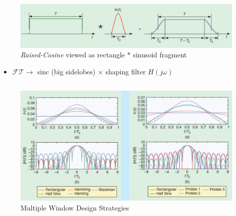 \documentclass[xcolor=dvipsnames,aspectratio=169]{beamer}
\begin{document}
{\begin{figure}
 \centering
 \caption{\textit{Raised-Cosine} viewed as rectangle $*$ sinusoid fragment}
 \includegraphics[width=1\textwidth]{rcresponse2.png}
\end{figure}
\begin{itemize}
\item $\mathcal{FT}\to$ sinc (big sidelobes) $\times$ shaping filter $H(j\omega)$
\begin{columns}
\end{columns}

\end{itemize}
\begin{figure}
 \centering
 \caption{Multiple Window Design Strategies}
 \includegraphics[width=.9\textwidth]{window-designs.png}
\end{figure}
}
\end{document}
